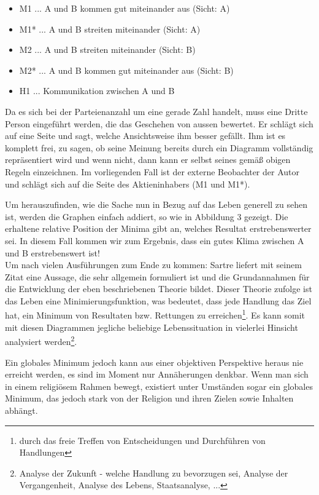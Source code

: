 \documentclass[12pt,a4paper,oneside]{article}
\begin{document}
  \begin{itemize}[label=]
    \item M1  ... A und B kommen gut miteinander aus (Sicht: A)
    \item M1* ... A und B streiten miteinander (Sicht: A)
    \item M2  ... A und B streiten miteinander (Sicht: B)
    \item M2* ... A und B kommen gut miteinander aus (Sicht: B)
    \item H1  ... Kommunikation zwischen A und B
  \end{itemize}
  
  Da es sich bei der Parteienanzahl um eine gerade Zahl handelt, muss eine Dritte Person eingeführt werden, die das Geschehen von aussen bewertet. Er schlägt sich auf eine Seite und sagt, welche Ansichtsweise ihm besser gefällt. Ihm ist es komplett frei, zu sagen, ob seine Meinung bereits durch ein Diagramm vollständig repräsentiert wird und wenn nicht, dann kann er selbst seines gemäß obigen Regeln einzeichnen. Im vorliegenden Fall ist der externe Beobachter der Autor und schlägt sich auf die Seite des Aktieninhabers (M1 und M1*). 
  
  Um herauszufinden, wie die Sache nun in Bezug auf das Leben generell zu sehen ist, werden die Graphen einfach addiert, so wie in Abbildung 3 gezeigt. Die erhaltene relative Position der Minima gibt an, welches Resultat erstrebenswerter sei. In diesem Fall kommen wir zum Ergebnis, dass ein gutes Klima zwischen A und B erstrebenswert ist! \\
  
  Um nach vielen Ausführungen zum Ende zu kommen: Sartre liefert mit seinem Zitat eine Aussage, die sehr allgemein formuliert ist und die Grundannahmen für die Entwicklung der eben beschriebenen Theorie bildet. Dieser Theorie zufolge ist das Leben eine Minimierungsfunktion, was bedeutet, dass jede Handlung das Ziel hat, ein Minimum von Resultaten bzw. Rettungen zu erreichen\footnote{durch das freie Treffen von Entscheidungen und Durchführen von Handlungen}. Es kann somit mit diesen Diagrammen jegliche beliebige Lebenssituation in vielerlei Hinsicht analysiert werden\footnote{Analyse der Zukunft - welche Handlung zu bevorzugen sei, Analyse der Vergangenheit, Analyse des Lebens, Staatsanalyse, ...}. 
  
  Ein globales Minimum jedoch kann aus einer objektiven Perspektive heraus nie erreicht werden, es sind im Moment nur Annäherungen denkbar. Wenn man sich in einem religiösem Rahmen bewegt, existiert unter Umständen sogar ein globales Minimum, das jedoch stark von der Religion und ihren Zielen sowie Inhalten abhängt. \\
  
\end{document}
